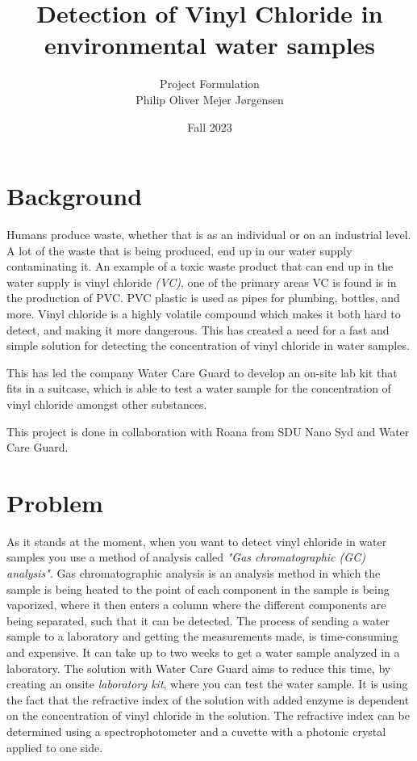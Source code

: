 \documentclass{article}
\title{Detection of Vinyl Chloride in environmental water samples}
\author{Project Formulation\\Philip Oliver Mejer Jørgensen}
\date{Fall 2023}
\begin{document}
\maketitle

\section*{Background}
Humans produce waste, whether that is as an individual or on an industrial level. A lot of the waste that is being produced, end up in our water supply contaminating it.
An example of a toxic waste product that can end up in the water supply is vinyl chloride \textit{(VC)}, one of the primary areas VC is found is in the production of PVC.
PVC plastic is used as pipes for plumbing, bottles, and more\cite{pvc_applications}.
Vinyl chloride is a highly volatile compound which makes it both hard to detect, and making it more dangerous.
This has created a need for a fast and simple solution for detecting the concentration of vinyl chloride in water samples.

This has led the company Water Care Guard to develop an on-site lab kit that fits in a suitcase, which is able to test a water sample for the concentration of vinyl chloride amongst other substances.

This project is done in collaboration with Roana from SDU Nano Syd and Water Care Guard.

\vspace{15mm}

\section*{Problem}
As it stands at the moment, when you want to detect vinyl chloride in water samples you use a method of analysis called \textit{"Gas chromatographic (GC) analysis"}\cite{vc_who}.
Gas chromatographic analysis is an analysis method in which the sample is being heated to the point of each component in the sample is being vaporized, where it then enters a column where the different components are being separated, such that it can be detected.\cite{gc_shimadzu}
The process of sending a water sample to a laboratory and getting the measurements made, is time-consuming and expensive.
It can take up to two weeks to get a water sample analyzed in a laboratory.\cite{water_analysis_cwt}
The solution with Water Care Guard aims to reduce this time, by creating an onsite \textit{laboratory kit}, where you can test the water sample.
It is using the fact that the refractive index of the solution with added enzyme is dependent on the concentration of vinyl chloride in the solution.
The refractive index can be determined using a spectrophotometer and a cuvette with a photonic crystal applied to one side.\cite{ri_dtu}\\
\end{document}
